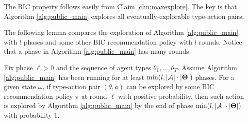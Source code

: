 The BIC property follows easily from Claim \ref{clm:maxexplore}. The key is that Algorithm \ref{alg:public_main} explores all  eventually-explorable type-action pairs.






The following lemma compares the exploration of Algorithm \ref{alg:public_main} with $l$ phases and some other BIC recommendation policy with $l$ rounds. Notice that a phase in Algorithm \ref{alg:public_main} has many rounds.
\begin{lemma}
\label{lem:exp_public}
Fix phase $\ell>0$ and the sequence of agent types $\theta_1,...,\theta_T$. Assume Algorithm \ref{alg:public_main} has been running for at least $\min(l, |\mathcal{A}|\cdot |\bold{\Theta}|)$ phases.
For a given state $\omega$, if type-action pair $(\theta,a)$ can be explored by some BIC recommendation policy $\pi$ at round $\ell$ with positive probability, then such action is explored by Algorithm \ref{alg:public_main} by the end of phase $\min(l, |\mathcal{A}|\cdot |\bold{\Theta}|)$ with probability $1$.
\end{lemma}

